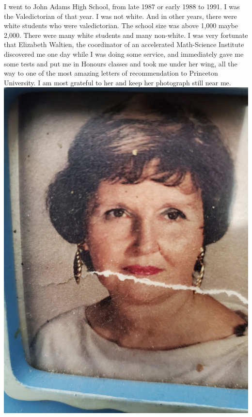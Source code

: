 \documentclass{amsart}
\begin{document}
I went to John Adams High School, from late 1987 or early 1988 to 1991.  I was the Valedictorian of that year.  I was not white.  And in other years, there were white students who were valedictorian.  The school size was above 1,000 maybe 2,000.  There were many white students and many non-white.  I was very fortunate that Elizabeth Waltien, the coordinator of an accelerated Math-Science Institute discovered me one day while I was doing some service, and immediately gave me some tests and put me in Honours classes and took me under her wing, all the way to one of the most amazing letters of recommendation to Princeton University.  I am most grateful to her and keep her photograph still near me.
\includegraphics[angle=270,scale=0.1]{lys.jpg}
\end{document}

